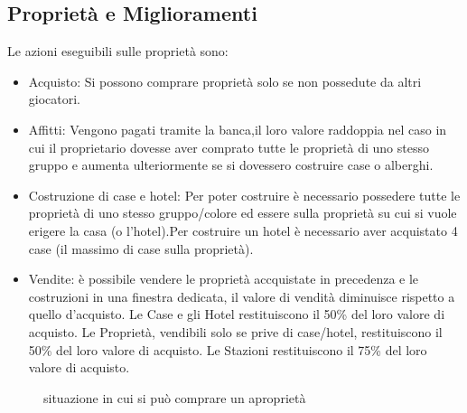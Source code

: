 \subsection{Proprietà e Miglioramenti}
Le azioni eseguibili sulle proprietà sono:
\begin{itemize}
    \item Acquisto: Si possono comprare proprietà solo se non possedute da altri giocatori.
    \item Affitti: Vengono pagati tramite la banca,\newline il loro valore raddoppia nel caso in cui il proprietario dovesse aver comprato tutte le proprietà di uno stesso gruppo e aumenta ulteriormente se si dovessero costruire case o alberghi.
    \item Costruzione di case e hotel: Per poter costruire è necessario possedere tutte le proprietà di uno stesso gruppo/colore ed essere sulla proprietà su cui si vuole erigere la casa (o l'hotel).\newline Per costruire un hotel è necessario aver acquistato 4 case (il massimo di case sulla proprietà).
    \item Vendite: è possibile vendere le proprietà accquistate in precedenza e le costruzioni in una finestra dedicata, il valore di vendità diminuisce rispetto a quello d'acquisto.\newline
    Le Case e gli Hotel restituiscono il 50\% del loro valore di acquisto.\newline
    Le Proprietà, vendibili solo se prive di case/hotel, restituiscono il 50\% del loro valore di acquisto.\newline
    Le Stazioni restituiscono il 75\% del loro valore di acquisto.
\end{itemize}
\begin{figure}[H]
    \centering
    \caption{situazione in cui si può comprare un aproprietà}
	\label{img:gamescreen}
\end{figure}
